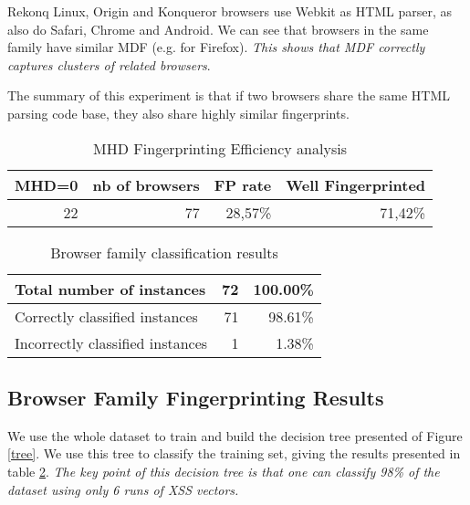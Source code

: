 \documentclass[10pt]{IEEEtran}
\begin{document}
Rekonq Linux, Origin  and Konqueror browsers use Webkit as HTML parser, 
as also do Safari, 
Chrome and Android.
We can see that browsers in the same family have similar MDF (e.g.  for Firefox).
\emph{This shows that MDF correctly captures clusters of related browsers}.  




The summary of this experiment is that if two browsers share the same HTML parsing code base, they 
also share highly similar fingerprints.
    
\begin{table}
  \centering
  \caption{MHD Fingerprinting Efficiency analysis}
    \begin{tabular}{r|r|r|r}
    \hline
    MHD=0 & nb of browsers & FP rate & Well Fingerprinted \\
    \hline
    22    & 77    & 28,57\% & 71,42\% \\
    \hline
    \end{tabular}
  \label{tab:mhdefficiency}
\end{table}
\begin{table}\center
\caption{Browser family classification results\label{results}}
\begin{tabular}{p{5.8cm}|r|r}
\hline
Total number of instances & 72 & 100.00\% \\
\hline
Correctly classified instances & 71 & 98.61\%  \\
\hline
Incorrectly classified instances & 1 & 1.38\%  \\
\hline
\end{tabular}
\end{table}


\subsection{Browser Family Fingerprinting Results}


\begin{figure*}
\caption{Executing only 6 XSS vectors enables us to classify the browser family with 98\% precision.}
\label{tree}
\end{figure*}
We use the whole dataset to train and build the decision tree presented of Figure \ref{tree}. We use this
tree to classify the training set, giving the results presented in table \ref{results}. 
\emph{The key point of this decision tree is that one can classify 98\% of the dataset using 
only 6 runs of XSS vectors.}
\end{document}

